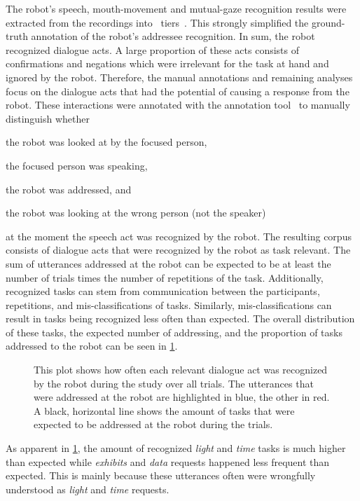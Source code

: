 The \gls{robot}'s speech, mouth-movement and mutual-gaze recognition results were extracted from the recordings into~ tiers~\cite{Bernotat2016}.
This strongly simplified the ground-truth annotation of the \gls{robot}'s \gls{addressee} recognition.
In sum, the \gls{robot} recognized  dialogue acts.
A large proportion of these acts consists of confirmations and negations which were irrelevant for the task at hand and ignored by the \gls{robot}.
Therefore, the manual annotations and remaining analyses focus on the dialogue acts that had the potential of causing a response from the \gls{robot}.
These interactions were annotated with the annotation tool~\cite{elansrc} to manually distinguish whether
\begin{enumerate*}[label=(\roman*)]
    \item the \gls{robot} was looked at by the focused person,
    \item the focused person was speaking,
    \item the \gls{robot} was addressed, and
    \item the \gls{robot} was looking at the wrong person (not the \gls{speaker})
\end{enumerate*}
at the moment the speech act was recognized by the \gls{robot}.
The resulting corpus consists of  dialogue acts that were recognized by the \gls{robot} as task relevant.
The sum of utterances addressed at the \gls{robot} can be expected to be at least the number of trials times the number of repetitions of the task.
Additionally, recognized tasks can stem from communication between the participants, repetitions, and mis-classifications of tasks.
Similarly, mis-classifications can result in tasks being recognized less often than expected.
The overall distribution of these tasks, the expected number of addressing, and the proportion of tasks addressed to the \gls{robot} can be seen in \cref{fig:meka-da-counts}.
\begin{figure}[htb]
    \centering
    
    \vspace{-25pt}
    \caption[Recognized dialogue acts during the study.]{\label{fig:meka-da-counts}
    This plot shows how often each relevant dialogue act was recognized by the \gls{robot} during the study over all trials.
    The utterances that were addressed at the \gls{robot} are highlighted in blue, the other in red.
    A black, horizontal line shows the amount of tasks that were expected to be addressed at the \gls{robot} during the trials.
    }
\end{figure}
As apparent in \cref{fig:meka-da-counts}, the amount of recognized \emph{light} and \emph{time} tasks is much higher than expected while \emph{exhibits} and \emph{data} requests happened less frequent than expected.
This is mainly because these utterances often were wrongfully understood as \emph{light} and \emph{time} requests.

